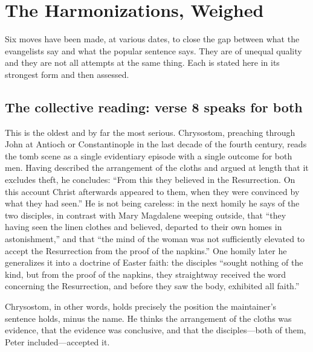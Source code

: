 \section{The Harmonizations, Weighed}

Six moves have been made, at various dates, to close the gap between what the
evangelists say and what the popular sentence says. They are of unequal
quality and they are not all attempts at the same thing. Each is stated here in
its strongest form and then assessed.

\subsection{The collective reading: verse 8 speaks for both}

This is the oldest and by far the most serious. Chrysostom, preaching through
John at Antioch or Constantinople in the last decade of the fourth century,
reads the tomb scene as a single evidentiary episode with a single outcome for
both men. Having described the arrangement of the cloths and argued at length
that it excludes theft, he concludes: ``From this they believed in the
Resurrection. On this account Christ afterwards appeared to them, when they
were convinced by what they had
seen.'' He is not being careless: in the next homily he says
of the two disciples, in contrast with Mary Magdalene weeping outside, that
``they having seen the linen clothes and believed, departed to their own homes
in astonishment,'' and that ``the mind of the woman was not sufficiently
elevated to accept the Resurrection from the proof of the
napkins.'' One homily later he
generalizes it into a doctrine of Easter faith: the disciples ``sought nothing
of the kind, but from the proof of the napkins, they straightway received the
word concerning the Resurrection, and before they saw the body, exhibited all
faith.''

Chrysostom, in other words, holds precisely the position the maintainer's
sentence holds, minus the name. He thinks the arrangement of the cloths was
evidence, that the evidence was conclusive, and that the disciples---both of
them, Peter included---accepted it.

